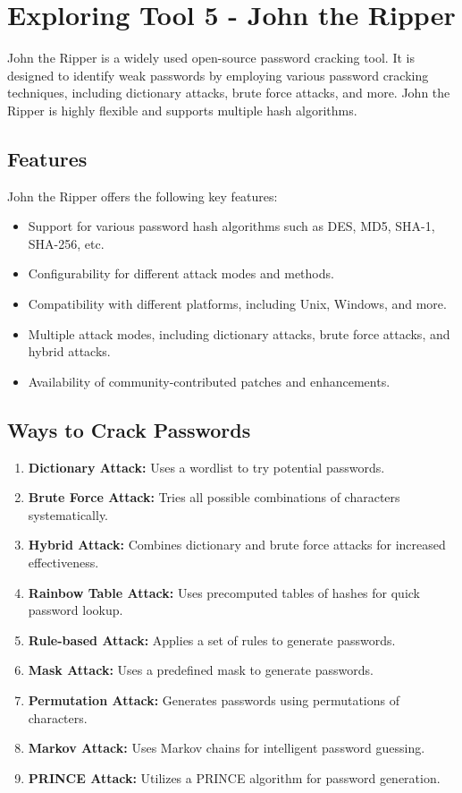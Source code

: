 \documentclass[11pt]{article}
\begin{document}
\section{Exploring Tool 5 - John the Ripper}
John the Ripper is a widely used open-source password cracking tool. It is designed to identify weak passwords by employing various password cracking techniques, including dictionary attacks, brute force attacks, and more. John the Ripper is highly flexible and supports multiple hash algorithms.

\subsection{Features}
John the Ripper offers the following key features:
\begin{itemize}
    \item Support for various password hash algorithms such as DES, MD5, SHA-1, SHA-256, etc.
    \item Configurability for different attack modes and methods.
    \item Compatibility with different platforms, including Unix, Windows, and more.
    \item Multiple attack modes, including dictionary attacks, brute force attacks, and hybrid attacks.
    \item Availability of community-contributed patches and enhancements.
\end{itemize}

\subsection{Ways to Crack Passwords}
\begin{enumerate}
    \item \textbf{Dictionary Attack:} Uses a wordlist to try potential passwords.
    \item \textbf{Brute Force Attack:} Tries all possible combinations of characters systematically.
    \item \textbf{Hybrid Attack:} Combines dictionary and brute force attacks for increased effectiveness.
    \item \textbf{Rainbow Table Attack:} Uses precomputed tables of hashes for quick password lookup.
    \item \textbf{Rule-based Attack:} Applies a set of rules to generate passwords.
    \item \textbf{Mask Attack:} Uses a predefined mask to generate passwords.
    \item \textbf{Permutation Attack:} Generates passwords using permutations of characters.
    \item \textbf{Markov Attack:} Uses Markov chains for intelligent password guessing.
    \item \textbf{PRINCE Attack:} Utilizes a PRINCE algorithm for password generation.
\end{enumerate}
\end{document}
